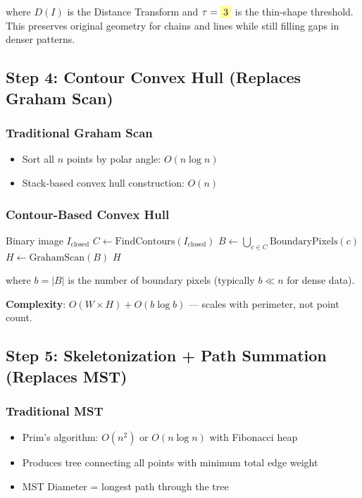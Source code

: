 \documentclass[11pt]{article}
\newcommand{\param}[1]{\colorbox{yellow!40}{$#1$}}
\begin{document}
where $D(I)$ is the Distance Transform and $\tau = \param{3}$ is the thin-shape threshold. This preserves original geometry for chains and lines while still filling gaps in denser patterns.


\subsection{Step 4: Contour Convex Hull (Replaces Graham Scan)}

\subsubsection{Traditional Graham Scan}
\begin{itemize}
    \item Sort all $n$ points by polar angle: $O(n \log n)$
    \item Stack-based convex hull construction: $O(n)$
\end{itemize}

\subsubsection{Contour-Based Convex Hull}

\begin{algorithm}[H]
\caption{Pixel Convex Hull}
\begin{algorithmic}[1]
\Require Binary image $I_{\text{closed}}$
\State $C \gets \text{FindContours}(I_{\text{closed}})$ 
\State $B \gets \bigcup_{c \in C} \text{BoundaryPixels}(c)$ 
\State $H \gets \text{GrahamScan}(B)$ 
\State \Return $H$
\end{algorithmic}
\end{algorithm}

where $b = |B|$ is the number of boundary pixels (typically $b \ll n$ for dense data).

\textbf{Complexity}: $O(W \times H) + O(b \log b)$ — scales with perimeter, not point count.

\subsection{Step 5: Skeletonization + Path Summation (Replaces MST)}

\subsubsection{Traditional MST}
\begin{itemize}
    \item Prim's algorithm: $O(n^2)$ or $O(n \log n)$ with Fibonacci heap
    \item Produces tree connecting all points with minimum total edge weight
    \item MST Diameter = longest path through the tree
\end{itemize}
\end{document}
